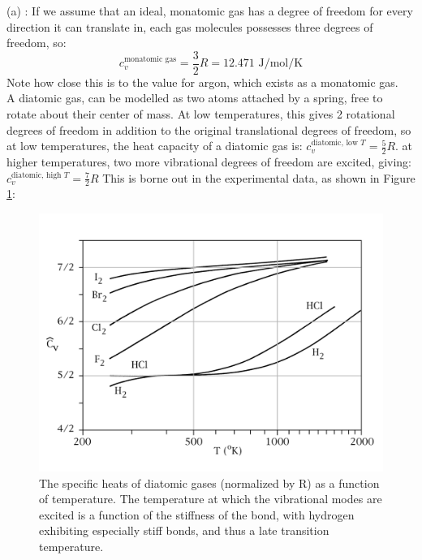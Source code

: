 \documentclass[12pt]{article}
\begin{document}
(a) : If we assume that an ideal, monatomic gas has a degree of freedom for every direction it can translate in, each gas molecules possesses three degrees of freedom, so:
\begin{equation}
c_v^{\text{monatomic gas}} = \frac{3}{2} R = 12.471 \text{ J/mol/K}
\end{equation}
Note how close this is to the value for argon, which exists as a monatomic gas.\\   %
A diatomic gas, can be modelled as two atoms attached by a spring, free to rotate about their center of mass. At low temperatures, this gives 2 rotational degrees of freedom in addition to the original translational degrees of freedom, so at low temperatures, the heat capacity of a diatomic gas is: $c_v^{\text{diatomic, low }T} = \frac{5}{2} R$.
at higher temperatures, two more vibrational degrees of freedom are excited, giving: $c_v^{\text{diatomic, high }T} = \frac{7}{2} R$
This is borne out in the experimental data, as shown in Figure \ref{CPofgases}:
\begin{figure}[h]
\centering
\includegraphics[width=\textwidth]{DiatomicSpecHeat2}
\caption{The specific heats of diatomic gases (normalized by R) as a function of temperature. The temperature at which the vibrational modes are excited is a function of the stiffness of the bond, with hydrogen exhibiting especially stiff bonds, and thus a late transition temperature.}
\label{CPofgases}
\end{figure}

\end{document}
